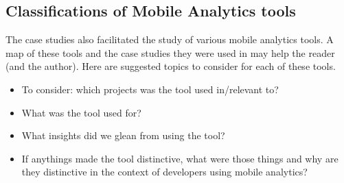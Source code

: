 \begin{comment}
MUST-DO
Disambiguate Contributions into Evidence, Insights, and the Distinct Opportunity/Perspectives it provided. Impact on the teams.
Consider an Insights table, mapping back on to the case studies. 
Insights in practices of the development teams. 
Try creating an evidence table. 
\end{comment}

\subsection{Classifications of Mobile Analytics tools}
The case studies also facilitated the study of various mobile analytics tools. A map of these tools and the case studies they were used in may help the reader (and the author). Here are suggested topics to consider for each of these tools.
\begin{itemize}
    \itemsep0em
    \item To consider: which projects was the tool used in/relevant to?
    \item What was the tool used for?
    \item What insights did we glean from using the tool?
    \item If anythings made the tool distinctive, what were those things and why are they distinctive in the context of developers using mobile analytics?
\end{itemize}

